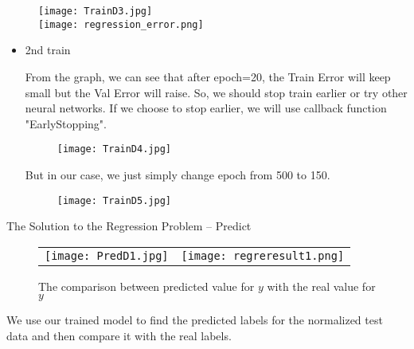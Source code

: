 \documentclass{beamer}
\begin{document}
\begin{frame}
\begin{figure}
  \texttt{[image: TrainD3.jpg]}\\
  \texttt{[image: regression\_error.png]}
\end{figure}

\end{frame}

\begin{frame}
\begin{itemize}
  \item 2nd train

From the graph, we can see that after epoch=20, the Train Error will keep small but the Val Error will raise. So, we should stop train earlier or try other neural networks. If we choose to stop earlier, we will use callback function "EarlyStopping".

\begin{figure}
  \texttt{[image: TrainD4.jpg]}\\
\end{figure}

But in our case, we just simply change epoch from 500 to 150.
\begin{figure}
  \texttt{[image: TrainD5.jpg]}\\
\end{figure}
\end{itemize}
\end{frame}


\begin{frame}{The Solution to the Regression Problem -- Predict}
\begin{figure}
  \begin{flushleft}
  \begin{tabular}{p{} p{}}
  \vspace{-10pt}\texttt{[image: PredD1.jpg]}& \vspace{-30pt}\texttt{[image: regreresult1.png]}
  \end{tabular}
  \end{flushleft}
  \caption{The comparison between predicted value for $y$ with the real value for $y$}
\end{figure}
\begin{flushleft}
We use our trained model to find the predicted labels for the normalized test data and then compare it with the real labels. 
\end{flushleft}
\end{frame}
\end{document}
